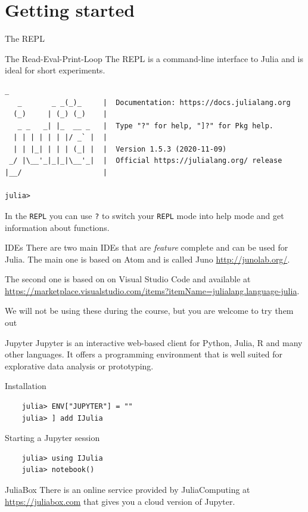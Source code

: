 \documentclass{beamer}
\begin{document}
\section{Getting started}
\begin{frame}[fragile]{The REPL}
  \begin{block}{The Read-Eval-Print-Loop}
    The REPL is a command-line interface to Julia and is ideal for short experiments.
    \begin{Verbatim}[fontsize=\footnotesize]
               _
   _       _ _(_)_     |  Documentation: https://docs.julialang.org
  (_)     | (_) (_)    |
   _ _   _| |_  __ _   |  Type "?" for help, "]?" for Pkg help.
  | | | | | | |/ _` |  |
  | | |_| | | | (_| |  |  Version 1.5.3 (2020-11-09)
 _/ |\__'_|_|_|\__'_|  |  Official https://julialang.org/ release
|__/                   |

julia> 
\end{Verbatim}

In the \verb|REPL| you can use \verb|?| to switch your \verb|REPL| mode into help mode and get information about functions.
  \end{block}
\end{frame}
\begin{frame}{IDEs}
  There are two main IDEs that are \emph{feature} complete and can be used for Julia. The main one is based on Atom and is called Juno \url{http://junolab.org/}.

\vspace{0.5cm}
  The second one is based on on Visual Studio Code and available at \url{https://marketplace.visualstudio.com/items?itemName=julialang.language-julia}.

\vspace{0.5cm}
  We will not be using these during the course, but you are welcome to try them out
\end{frame}
\begin{frame}[fragile]{Jupyter}
  Jupyter is an interactive web-based client for Python, Julia, R and many other languages.
  It offers a programming environment that is well suited for explorative data analysis or prototyping.
  \begin{block}{Installation}
  \begin{Verbatim}
    julia> ENV["JUPYTER"] = ""
    julia> ] add IJulia
    \end{Verbatim}
  \end{block}
  \begin{block}{Starting a Jupyter session}
    \begin{Verbatim}
    julia> using IJulia
    julia> notebook()
    \end{Verbatim}
  \end{block}
  \begin{block}{JuliaBox}
    There is an online service provided by JuliaComputing at \url{https://juliabox.com} that gives you a cloud version of Jupyter.
  \end{block}
\end{frame}
\end{document}
